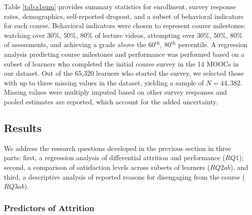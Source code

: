 \documentclass{sigchi}\usepackage[]{graphicx}\usepackage[]{color}
\begin{document}
Table \ref{tab:s1sum} provides summary statistics for enrollment, survey response rates, demographics, self-reported dropout, and a subset of behavioral indicators for each course. Behavioral indicators were chosen to represent course milestones: watching over 30\%, 50\%, 80\% of lecture videos, attempting over 30\%, 50\%, 80\% of assessments, and achieving a grade above the 60$^\text{th}$, 80$^\text{th}$ percentile. A regression analysis predicting course milestones and performance was performed based on a subset of learners who completed the initial course survey in the 14 MOOCs in our dataset. Out of the 65,320 learners who started the survey, we selected those with up to three missing values in the dataset, yielding a sample of $N=44,382$. Missing values were multiply imputed based on other survey responses and pooled estimates are reported, which account for the added uncertainty.
 
\subsection{Results}

We address the research questions developed in the previous section in three parts: first, a regression analysis of differential attrition and performance ($RQ1$); second, a comparison of satisfaction levels across subsets of learners ($RQ2ab$), and third, a descriptive analysis of reported reasons for disengaging from the course ($RQ3ab$).

\subsubsection{Predictors of Attrition}
\end{document}
